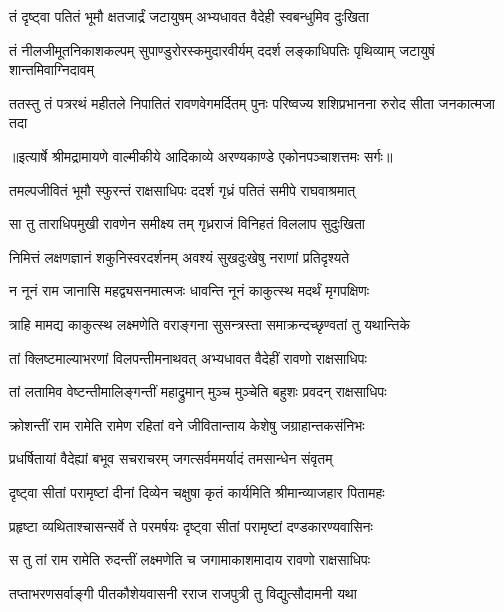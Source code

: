 \twolineshloka
{तं दृष्ट्वा पतितं भूमौ क्षतजार्द्रं जटायुषम्}
{अभ्यधावत वैदेही स्वबन्धुमिव दुःखिता} %

\fourlineindentedshloka
{तं नीलजीमूतनिकाशकल्पम्}
{सुपाण्डुरोरस्कमुदारवीर्यम्}
{ददर्श लङ्काधिपतिः पृथिव्याम्}
{जटायुषं शान्तमिवाग्निदावम्} %

\fourlineindentedshloka
{ततस्तु तं पत्ररथं महीतले}
{निपातितं रावणवेगमर्दितम्}
{पुनः परिष्वज्य शशिप्रभानना}
{रुरोद सीता जनकात्मजा तदा} %


{॥इत्यार्षे श्रीमद्रामायणे वाल्मीकीये आदिकाव्ये अरण्यकाण्डे एकोनपञ्चाशत्तमः सर्गः॥}


\twolineshloka
{तमल्पजीवितं भूमौ स्फुरन्तं राक्षसाधिपः}
{ददर्श गृध्रं पतितं समीपे राघवाश्रमात्} %

\twolineshloka
{सा तु ताराधिपमुखी रावणेन समीक्ष्य तम्}
{गृध्रराजं विनिहतं विललाप सुदुःखिता} %

\twolineshloka
{निमित्तं लक्षणज्ञानं शकुनिस्वरदर्शनम्}
{अवश्यं सुखदुःखेषु नराणां प्रतिदृश्यते} %

\twolineshloka
{न नूनं राम जानासि महद्व्यसनमात्मजः}
{धावन्ति नूनं काकुत्स्थ मदर्थं मृगपक्षिणः} %

\twolineshloka
{त्राहि मामद्य काकुत्स्थ लक्ष्मणेति वराङ्गना}
{सुसन्त्रस्ता समाक्रन्दच्छृण्वतां तु यथान्तिके} %

\twolineshloka
{तां क्लिष्टमाल्याभरणां विलपन्तीमनाथवत्}
{अभ्यधावत वैदेहीं रावणो राक्षसाधिपः} %

\twolineshloka
{तां लतामिव वेष्टन्तीमालिङ्गन्तीं महाद्रुमान्}
{मुञ्च मुञ्चेति बहुशः प्रवदन् राक्षसाधिपः} %

\twolineshloka
{क्रोशन्तीं राम रामेति रामेण रहितां वने}
{जीवितान्ताय केशेषु जग्राहान्तकसंनिभः} %

\twolineshloka
{प्रधर्षितायां वैदेह्यां बभूव सचराचरम्}
{जगत्सर्वममर्यादं तमसान्धेन संवृतम्} %

\twolineshloka
{दृष्ट्वा सीतां परामृष्टां दीनां दिव्येन चक्षुषा}
{कृतं कार्यमिति श्रीमान्व्याजहार पितामहः} %

\twolineshloka
{प्रहृष्टा व्यथिताश्चासन्सर्वे ते परमर्षयः}
{दृष्ट्वा सीतां परामृष्टां दण्डकारण्यवासिनः} %

\twolineshloka
{स तु तां राम रामेति रुदन्तीं लक्ष्मणेति च}
{जगामाकाशमादाय रावणो राक्षसाधिपः} %

\twolineshloka
{तप्ताभरणसर्वाङ्गी पीतकौशेयवासनी}
{रराज राजपुत्री तु विद्युत्सौदामनी यथा} %

